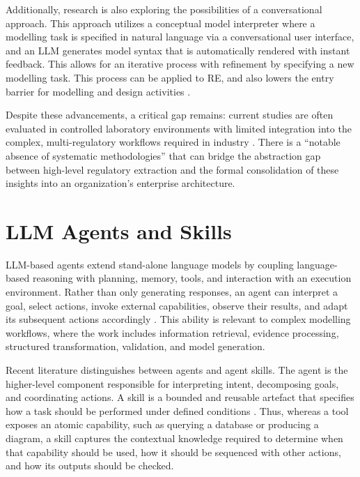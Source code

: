 Additionally, research is also exploring the possibilities of a conversational approach. This approach utilizes a conceptual model interpreter where a modelling task is specified in natural language via a conversational user interface, and an \ac{LLM} generates model syntax that is automatically rendered with instant feedback. This allows for an iterative process with refinement by specifying a new modelling task. This process can be applied to \ac{RE}, and also lowers the entry barrier for modelling and design activities \cite{Haerer2023}.

Despite these advancements, a critical gap remains: current studies are often evaluated in controlled laboratory environments with limited integration into the complex, multi-regulatory workflows required in industry \cite{Zadenoori2025}. There is a ``notable absence of systematic methodologies''\cite{Elahidoost2024} that can bridge the abstraction gap between high-level regulatory extraction and the formal consolidation of these insights into an organization's enterprise architecture.

\section{\ac{LLM} Agents and Skills}

\ac{LLM}-based agents extend stand-alone language models by coupling language-based reasoning with planning, memory, tools, and interaction with an execution environment. Rather than only generating responses, an agent can interpret a goal, select actions, invoke external capabilities, observe their results, and adapt its subsequent actions accordingly \cite{ZhouEtAl2026AgentSkills}. This ability is relevant to complex modelling workflows, where the work includes information retrieval, evidence processing, structured transformation, validation, and model generation.

Recent literature distinguishes between agents and agent skills. The agent is the higher-level component responsible for interpreting intent, decomposing goals, and coordinating actions. A skill is a bounded and reusable artefact that specifies how a task should be performed under defined conditions \cite{ZhouEtAl2026AgentSkills,XuYan2026AgentSkills}. Thus, whereas a tool exposes an atomic capability, such as querying a database or producing a diagram, a skill captures the contextual knowledge required to determine when that capability should be used, how it should be sequenced with other actions, and how its outputs should be checked.

